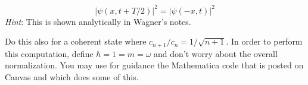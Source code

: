 \documentclass[../psets.tex]{subfiles}
\begin{document}
\begin{enumerate}
    \begin{equation}
        |\psi(x,t+T/2)|^2 = |\psi(-x,t)|^2
    \end{equation}
    \emph{Hint}: This is shown analytically in Wagner's notes.\par
    Do this also for a coherent state where $c_{n+1}/c_n=1/\sqrt{n+1}$. In order to perform this computation, define $\hbar=1=m=\omega$ and don't worry about the overall normalization. You may use for guidance the Mathematica code that is posted on Canvas and which does some of this.
\end{enumerate}
\end{document}
